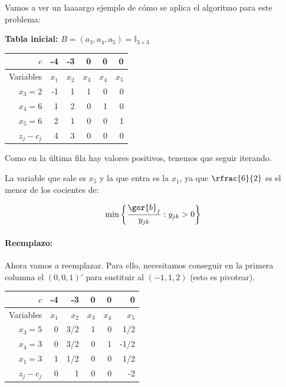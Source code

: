 \begin{example}

Vamos a ver un laaaargo ejemplo de cómo se aplica el algoritmo para este problema:

\begin{ioprob}
\end{ioprob}


\textbf{Tabla inicial:}  $B=(a_3,a_4,a_5) = \mathbb{I}_{3\times 3}$



\begin{table}[hbtp]
\centering
\begin{tabular}{r || rr|rrr}
$c$ & -4 & -3 & 0 & 0 & 0 \\ \hline
Variables & $x_1$ & $x_2$ & $x_3$ & $x_4$ & $x_5$ \\ \hline
$x_3 = 2$ & -1 & 1 & 1 & 0 & 0 \\
$x_4=6$   & 1 & 2 & 0 & 1 & 0  \\
$x_5=6$ & 2 & 1 & 0 & 0 & 1 \\ \hline
$z_j-c_j$ & 4 & 3 & 0 & 0 & 0 
\end{tabular}
\end{table}

Como en la última fila hay valores positivos, tenemos que seguir iterando. 

La variable que sale es $x_5$ y la que entra es la $x_1$, ya que $\rfrac{6}{2}$ es el menor de los cocientes de:

\[\min\left\{\frac{\gor{b}_j}{y_{jk}}: y_{jk}>0\right\}\]

\paragraph{Reemplazo:}

Ahora vamos a reemplazar. Para ello, necesitamos conseguir en la primera columna el $(0,0,1)'$ para sustituir al $(-1,1,2)$ (esto es pivotear).

\begin{table}[hbtp]
\centering
\begin{tabular}{r | rrrrr}
$c$ & -4 & -3 & 0 & 0 & 0 \\ \hline
Variables & $x_1$ & $x_2$ & $x_3$ & $x_4$ & $x_5$ \\ \hline
$x_3=5$ & 0 & 3/2 & 1 & 0 & 1/2 \\
$x_4=3$   & 0 & 3/2 & 0 & 1 & -1/2  \\
$x_1=3$ & 1 & 1/2 & 0 & 0 & 1/2 \\ \hline
$z_j-c_j$ &  0 & 1 & 0 & 0 & -2 
\end{tabular}
\end{table}


\end{example}
